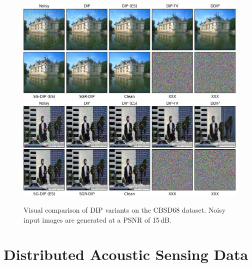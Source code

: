 \begin{figure}
    \centering
    \includegraphics[width=\textwidth]{img/fig_6.1_1.png}\\
    \vspace{20pt}
    \includegraphics[width=\textwidth]{img/fig_6.1_2.png}
    \caption{
        Visual comparison of DIP variants on the CBSD68 dataset.
        Noisy input images are generated at a PSNR of 15\,dB.
    }\label{fig:CBSD68}
\end{figure}

\section{Distributed Acoustic Sensing Data}
